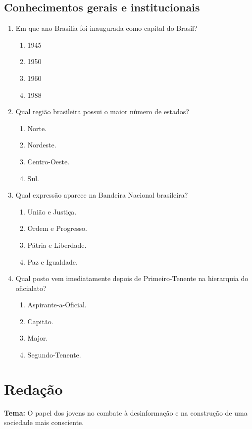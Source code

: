 \documentclass[12pt,a4paper]{article}
\begin{document}
\subsection*{Conhecimentos gerais e institucionais}
\begin{enumerate}[resume]
  \item Em que ano Brasília foi inaugurada como capital do Brasil?
  \begin{enumerate}[label=\alph*)]
    \item 1945
    \item 1950
    \item 1960
    \item 1988
  \end{enumerate}

  \item Qual região brasileira possui o maior número de estados?
  \begin{enumerate}[label=\alph*)]
    \item Norte.
    \item Nordeste.
    \item Centro-Oeste.
    \item Sul.
  \end{enumerate}

  \item Qual expressão aparece na Bandeira Nacional brasileira?
  \begin{enumerate}[label=\alph*)]
    \item União e Justiça.
    \item Ordem e Progresso.
    \item Pátria e Liberdade.
    \item Paz e Igualdade.
  \end{enumerate}

  \item Qual posto vem imediatamente depois de Primeiro-Tenente na hierarquia do oficialato?
  \begin{enumerate}[label=\alph*)]
    \item Aspirante-a-Oficial.
    \item Capitão.
    \item Major.
    \item Segundo-Tenente.
  \end{enumerate}
\end{enumerate}

\newpage
\section*{Redação}
\noindent\textbf{Tema:} O papel dos jovens no combate à desinformação e na construção de uma sociedade mais consciente.
\end{document}
